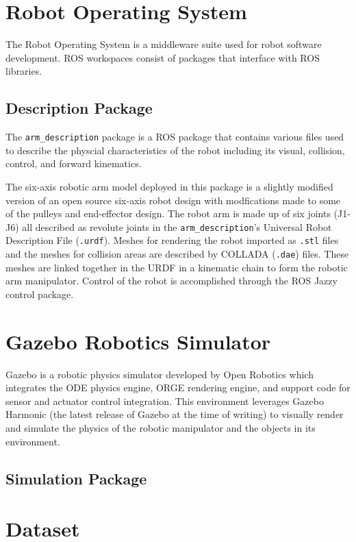 \documentclass[doublespace,draft,nopageskip]{VTthesis} %
\begin{document}
    \section{Robot Operating System} \label{se:robot_operating_system}
    The Robot Operating System is a middleware suite used for robot software development.
    ROS workspaces consist of packages that interface with ROS libraries. 
    \subsection{Description Package} \label{ss:description_package}
    The \texttt{arm\_description} package is a ROS package that contains various files used to describe the physcial characteristics of the robot including its visual, collision, control, and forward kinematics.

    The six-axis robotic arm model deployed in this package is a slightly modified version of an open source six-axis robot design with modfications made to some of the pulleys and end-effector design. The robot arm is made up of six joints (J1-J6) all described as revolute joints in the \texttt{arm\_description}'s Universal Robot Description File (\texttt{.urdf}). Meshes for rendering the robot imported as \texttt{.stl} files and the meshes for collision areas are described by COLLADA (\texttt{.dae}) files. These meshes are linked together in the URDF in a kinematic chain to form the robotic arm manipulator.
    Control of the robot is accomplished through the ROS Jazzy control package.
    \section{Gazebo Robotics Simulator} \label{se:gazebo_harmonic_robotics_simulator}
        Gazebo is a robotic physics simulator developed by Open Robotics which integrates the ODE physics engine, ORGE rendering engine, and support code for sensor and actuator control integration. This environment leverages Gazebo Harmonic (the latest release of Gazebo at the time of writing) to visually render and simulate the physics of the robotic manipulator and the objects in its environment. 
    \subsection{Simulation Package} \label{ss:simulation_package}
    \section{Dataset} \label{se:dataset}
     
\end{document}
